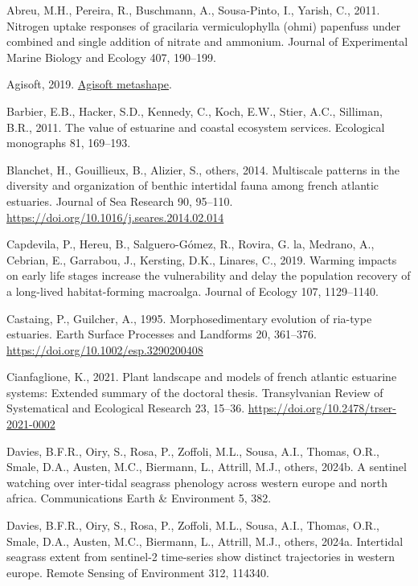 \documentclass[
  letterpaper,
  DIV=11,
  numbers=noendperiod]{scrartcl}
\newlength{\cslhangindent}
\newenvironment{CSLReferences}[2] %
 {\begin{list}{}{%
  \setlength{\itemindent}{0pt}
  \setlength{\leftmargin}{0pt}
  \setlength{\parsep}{0pt}
  \ifodd #1
   \setlength{\leftmargin}{\cslhangindent}
   \setlength{\itemindent}{-1\cslhangindent}
  \fi
  \setlength{\itemsep}{#2\baselineskip}}}
 {\end{list}}
\begin{document}
\label{refs}
\begin{CSLReferences}{1}{0}
Abreu, M.H., Pereira, R., Buschmann, A., Sousa-Pinto, I., Yarish, C.,
2011. Nitrogen uptake responses of gracilaria vermiculophylla (ohmi)
papenfuss under combined and single addition of nitrate and ammonium.
Journal of Experimental Marine Biology and Ecology 407, 190--199.

Agisoft, 2019. \href{https://www.agisoft.com/}{Agisoft metashape}.

Barbier, E.B., Hacker, S.D., Kennedy, C., Koch, E.W., Stier, A.C.,
Silliman, B.R., 2011. The value of estuarine and coastal ecosystem
services. Ecological monographs 81, 169--193.

Blanchet, H., Gouillieux, B., Alizier, S., others, 2014. Multiscale
patterns in the diversity and organization of benthic intertidal fauna
among french atlantic estuaries. Journal of Sea Research 90, 95--110.
\url{https://doi.org/10.1016/j.seares.2014.02.014}

Capdevila, P., Hereu, B., Salguero-Gómez, R., Rovira, G. la, Medrano,
A., Cebrian, E., Garrabou, J., Kersting, D.K., Linares, C., 2019.
Warming impacts on early life stages increase the vulnerability and
delay the population recovery of a long-lived habitat-forming macroalga.
Journal of Ecology 107, 1129--1140.

Castaing, P., Guilcher, A., 1995. Morphosedimentary evolution of
ria-type estuaries. Earth Surface Processes and Landforms 20, 361--376.
\url{https://doi.org/10.1002/esp.3290200408}

Cianfaglione, K., 2021. Plant landscape and models of french atlantic
estuarine systems: Extended summary of the doctoral thesis.
Transylvanian Review of Systematical and Ecological Research 23, 15--36.
\url{https://doi.org/10.2478/trser-2021-0002}

Davies, B.F.R., Oiry, S., Rosa, P., Zoffoli, M.L., Sousa, A.I., Thomas,
O.R., Smale, D.A., Austen, M.C., Biermann, L., Attrill, M.J., others,
2024b. A sentinel watching over inter-tidal seagrass phenology across
western europe and north africa. Communications Earth \& Environment 5,
382.

Davies, B.F.R., Oiry, S., Rosa, P., Zoffoli, M.L., Sousa, A.I., Thomas,
O.R., Smale, D.A., Austen, M.C., Biermann, L., Attrill, M.J., others,
2024a. Intertidal seagrass extent from sentinel-2 time-series show
distinct trajectories in western europe. Remote Sensing of Environment
312, 114340.


\end{CSLReferences}
\end{document}
